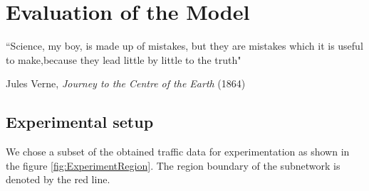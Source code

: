 
\chapter{Evaluation of the Model} %

\label{Chapter5} %


``Science, my boy, is made up of mistakes, but they are mistakes which it is useful to make,because
they lead little by little to the truth"

\begin{flushright}
Jules Verne, \textit{Journey to the Centre of the Earth} (1864)
\end{flushright}


\section{Experimental setup}
We chose a subset of the obtained traffic data for experimentation as shown in the figure
\ref{fig:ExperimentRegion}. The region boundary of the subnetwork is denoted by the red line.

